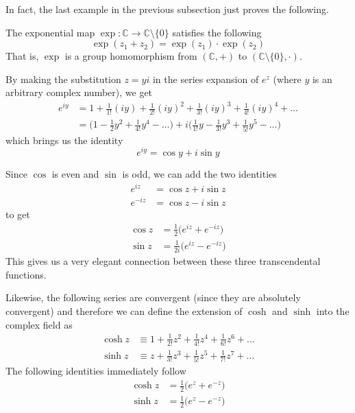     In fact, the last example in the previous subsection just proves the following. 

    \begin{lemma}
      The exponential map $\exp: \mathbb{C} \longrightarrow \mathbb{C}\setminus \{0\}$ satisfies the following
      \[\exp(z_1 + z_2) = \exp(z_1) \cdot \exp (z_2)\]
      That is, $\exp$ is a group homomorphism from $(\mathbb{C}, +)$ to $(\mathbb{C} \setminus \{0\}, \cdot)$. 
    \end{lemma}

    \begin{definition}
      By making the substitution $z = yi$ in the series expansion of $e^z$ (where $y$ is an arbitrary complex number), we get 
      \begin{align*}
          e^{iy} & = 1 + \frac{1}{1!} (iy) + \frac{1}{2!}(iy)^2 + \frac{1}{3!} (iy)^3 + \frac{1}{4!} (iy)^4 + \ldots \\
          & = \bigg(1 - \frac{1}{2} y^2 + \frac{1}{4!} y^4 - \ldots \bigg) + i \bigg(\frac{1}{1!} y - \frac{1}{3!} y^3 + \frac{1}{5!} y^5 - \ldots \bigg)
      \end{align*}
      which brings us the identity
      \[e^{iy} = \cos{y} + i \sin{y}\]
    \end{definition}

    Since $\cos$ is even and $\sin$ is odd, we can add the two identities
    \begin{align*}
        e^{iz} & = \cos{z} + i \sin{z} \\
        e^{-iz} & = \cos{z} - i \sin{z} 
    \end{align*}
    to get 
    \begin{align*}
        \cos{z} & = \frac{1}{2}\big( e^{iz} + e^{-iz} \big) \\
        \sin{z} & = \frac{1}{2i} \big( e^{iz} - e^{-iz} \big)
    \end{align*}
    This gives us a very elegant connection between these three transcendental functions. 

    \begin{definition}
      Likewise, the following series are convergent (since they are absolutely convergent) and therefore we can define the extension of $\cosh$ and $\sinh$ into the complex field as 
      \begin{align*}
          \cosh{z} & \equiv 1 + \frac{1}{2!} z^2 + \frac{1}{4!} z^4 + \frac{1}{6!} z^6 + \ldots \\
          \sinh{z} & \equiv z + \frac{1}{3!} z^3 + \frac{1}{5!} z^5 + \frac{1}{7!} z^7 + \ldots 
      \end{align*}
      The following identities immediately follow
      \begin{align*}
          \cosh{z} & = \frac{1}{2} \big( e^z + e^{-z} \big) \\
          \sinh{z} & = \frac{1}{2} \big( e^{z} - e^{-z}\big) 
      \end{align*}
    \end{definition}

